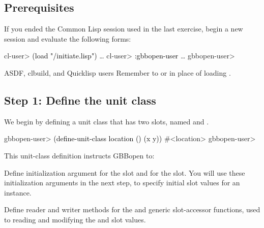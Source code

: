 \documentclass[10pt,twoside,english,pdftex]{article}
\begin{document}
\fndocrule

\subsection*{Prerequisites}

%
%
If you ended the Common Lisp session used in the last exercise, begin a new
session and evaluate the following forms:
%
\W\supp
\begin{example}
\textcolor{darkergray}{%
  cl-user> \textcolor{black}{(load "/initiate.lisp")}
     \textrm{\ldots{}}
  cl-user> \textcolor{black}{:gbbopen-user}
     \textrm{\ldots{}}
  gbbopen-user>}
\end{example}

%
%
\begin{notebox}{ASDF, clbuild, and Quicklisp users}
  Remember to  or
   in place of loading
  .
\end{notebox}

\subsection*{Step 1: Define the  unit class}

%
%
%
We begin by defining a unit class  that has two slots,
named  and .
%
\W\supp
\begin{example}
\textcolor{darkergray}{%
  gbbopen-user> \textcolor{black}{(define-unit-class location ()
                  (x y))}
  #<location>
  gbbopen-user>}
\end{example}

This unit-class definition instructs GBBopen to:
%
\begin{tightitemize}
\item Define initialization argument  for the  slot
  and  for the  slot.  You will use these
  initialization arguments in the next step, to specify initial slot
  values for an instance.
\item Define reader and writer methods for the  and
   generic slot-accessor functions, used to reading and
  modifying the  and  slot values.
\end{tightitemize}
\end{document}
